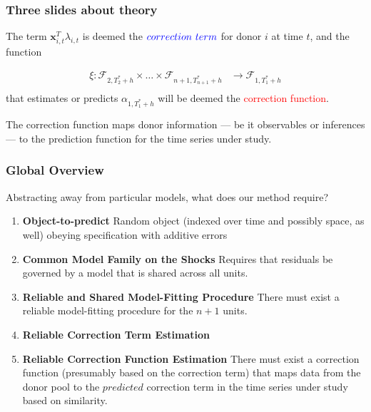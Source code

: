 \documentclass[9pt]{beamer}
\newcommand{\x}{\textbf{x}}
\theoremstyle{definition}
\begin{document}
\begin{frame}\frametitle{Three slides about theory}
    The term $\x^{T}_{i,t}\lambda_{i,t}$ is deemed the $\textcolor{blue}{correction} \text{ } \textcolor{blue}{term}$ for donor $i$ at time $t$, and the function

    \begin{align*}
      \xi \colon \mathcal{F}_{2,T^{*}_{2}+h} \times \ldots \times \mathcal{F}_{n+1, T^{*}_{n+1}+h} &\to \mathcal{F}_{1,T^{*}_{1}+h}\\
    \end{align*}
    that estimates or predicts $\alpha_{1,T^{*}_{1}+h}$ will be deemed the \textcolor{red}{correction function}.  
    
    \bigskip 
    
    The correction function maps donor information --- be it observables or inferences --- to the prediction function for the time series under study. 
\end{frame}

\begin{frame}\frametitle{Global Overview}

    Abstracting away from particular models, what does our method require?

    \begin{enumerate}
        \item <1-> \textbf{Object-to-predict}
       Random object (indexed over time and possibly space, as well) obeying specification with additive errors 
            
      \item <2-> \textbf{Common Model Family on the Shocks} Requires that residuals be governed by a model that is shared across all units.  
      
      \item<3->  \textbf{Reliable and Shared Model-Fitting Procedure} There must exist a reliable model-fitting procedure for the $n+1$ units.
      
      \item<4-> \textbf{Reliable Correction Term Estimation} 

      \item<5->  \textbf{Reliable Correction Function Estimation} There must exist a correction function (presumably based on the correction term) that maps data from the donor pool to the $\textit{predicted}$ correction term in the time series under study based on similarity.  
    \end{enumerate}
\end{frame}
\end{document}

